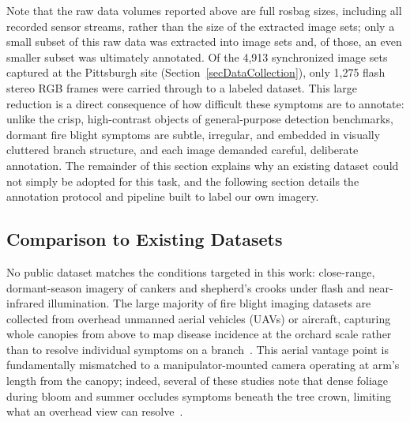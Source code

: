 Note that the raw data volumes reported above are full rosbag sizes,
including all recorded sensor streams, rather than the size of the
extracted image sets; only a small subset of this raw data was
extracted into image sets and, of those, an even smaller subset was
ultimately annotated.
Of the 4{,}913 synchronized image sets captured at the Pittsburgh
site (Section~\ref{secDataCollection}), only 1{,}275 flash stereo RGB
frames were carried through to a labeled dataset.
This large reduction is a direct consequence of how difficult these
symptoms are to annotate: unlike the crisp, high-contrast objects of
general-purpose detection benchmarks, dormant fire blight symptoms are
subtle, irregular, and embedded in visually cluttered branch
structure, and each image demanded careful, deliberate annotation.
The remainder of this section explains why an existing dataset could
not simply be adopted for this task, and the following section
details the annotation protocol and pipeline built to label our own
imagery.

\subsection{Comparison to Existing Datasets} \label{secDatasetComparison}

No public dataset matches the conditions targeted in this work:
close-range, dormant-season imagery of cankers and shepherd's crooks
under flash and near-infrared illumination.
The large majority of fire blight imaging datasets are collected from
overhead unmanned aerial vehicles (UAVs) or aircraft, capturing whole
canopies from above to map disease incidence at the orchard scale
rather than to resolve individual symptoms on a
branch~\cite{Bagheri2020AerialDetectionFireBlightPear,
kang2020DroneDetectionFireBlightPear,
schoofs2020UAVFireBlightPearSpectral,
Xiao2022UAVFireBlightAppleMultispectral}.
This aerial vantage point is fundamentally mismatched to a
manipulator-mounted camera operating at arm's length from the canopy;
indeed, several of these studies note that dense foliage during bloom
and summer occludes symptoms beneath the tree crown, limiting what an
overhead view can
resolve~\cite{Bagheri2020AerialDetectionFireBlightPear,
Mahmud2023MaskRCNNFireBlight}.

